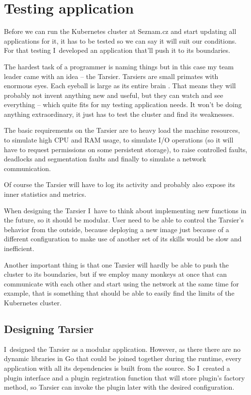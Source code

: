 \chapter{Testing application}

Before we can run the Kubernetes cluster at Seznam.cz and start updating all applications for it, it has to be tested so we can say it will suit our conditions. For that testing I~developed an application that’ll push it to its boundaries.

The hardest task of a programmer is naming things \cite{programming-naming} but in this case my team leader came with an idea -- the Tarsier. Tarsiers are small primates with enormous eyes. Each eyeball is large as its entire brain \cite{tarsier}.  That means they will probably not invent anything new and useful, but they can watch and see everything -- which quite fits for my testing application needs. It won’t be doing anything extraordinary, it just has to test the cluster and find its weaknesses.

The basic requirements on the Tarsier are to heavy load the machine resources, to simulate high CPU and RAM usage, to simulate I/O operations (so it will have to request permissions on some persistent storage), to raise controlled faults, deadlocks and segmentation faults and finally to simulate a network communication.

Of course the Tarsier will have to log its activity and probably also expose its inner statistics and metrics.

When designing the Tarsier I~have to think about implementing new functions in the future, so it should be modular. User need to be able to control the Tarsier’s behavior from the outside, because deploying a new image just because of a different configuration to make use of another set of its skills would be slow and inefficient.

Another important thing is that one Tarsier will hardly be able to push the cluster to its boundaries, but if we employ many monkeys at once that can communicate with each other and start using the network at the same time for example, that is something that should be able to easily find the limits of the Kubernetes cluster.

\section{Designing Tarsier}

I~designed the Tarsier as a modular application. However, as there there are no dynamic libraries in Go that could be joined together during the runtime, every application with all its dependencies is built from the source. So I~created a plugin interface and a plugin registration function that will store plugin’s factory method, so Tarsier can invoke the plugin later with the desired configuration.

